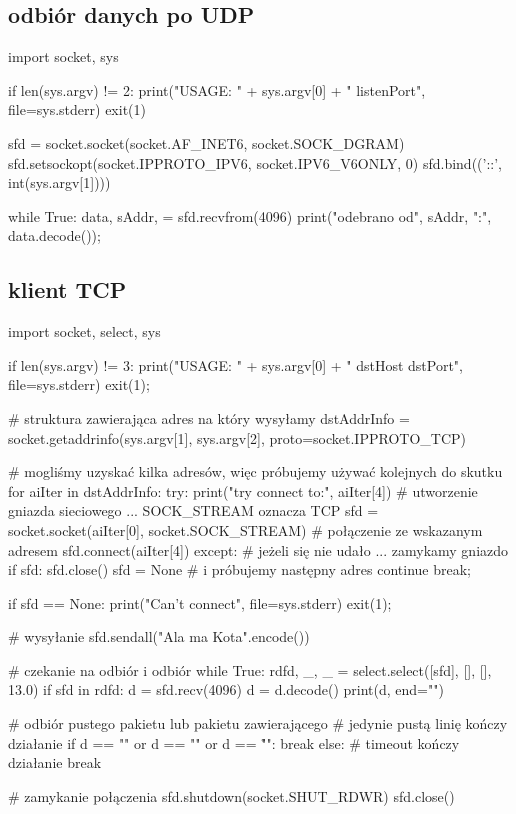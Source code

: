 \subsection{odbiór danych po UDP}
\begin{CodeFrame*}[python]{}
import socket, sys

if len(sys.argv) != 2:
  print("USAGE: " + sys.argv[0] + " listenPort", file=sys.stderr)
  exit(1)

sfd = socket.socket(socket.AF_INET6, socket.SOCK_DGRAM)
sfd.setsockopt(socket.IPPROTO_IPV6, socket.IPV6_V6ONLY, 0)
sfd.bind(('::', int(sys.argv[1])))

while True:
  data, sAddr, = sfd.recvfrom(4096)
  print("odebrano od", sAddr, ":", data.decode());
\end{CodeFrame*}

\subsection{klient TCP}
\begin{CodeFrame*}[python]{}
import socket, select, sys

if len(sys.argv) != 3:
	print("USAGE: " + sys.argv[0] + " dstHost dstPort", file=sys.stderr)
	exit(1);

# struktura zawierająca adres na który wysyłamy
dstAddrInfo = socket.getaddrinfo(sys.argv[1], sys.argv[2], proto=socket.IPPROTO_TCP)

# mogliśmy uzyskać kilka adresów, więc próbujemy używać kolejnych do skutku
for aiIter in dstAddrInfo:
	try:
		print("try connect to:", aiIter[4])
		# utworzenie gniazda sieciowego ... SOCK_STREAM oznacza TCP
		sfd = socket.socket(aiIter[0], socket.SOCK_STREAM)
		# połączenie ze wskazanym adresem
		sfd.connect(aiIter[4])
	except:
		# jeżeli się nie udało ... zamykamy gniazdo
		if sfd:
			sfd.close()
		sfd = None
		# i próbujemy następny adres
		continue
	break;

if sfd == None:
	print("Can't connect", file=sys.stderr)
	exit(1);

# wysyłanie
sfd.sendall("Ala ma Kota\n".encode())

# czekanie na odbiór i odbiór
while True:
	rdfd, _, _ = select.select([sfd], [], [], 13.0)
	if sfd in rdfd:
		d = sfd.recv(4096)
		d = d.decode()
		print(d, end="")
		
		# odbiór pustego pakietu lub pakietu zawierającego
		# jedynie pustą linię kończy działanie
		if d == "" or d == "\n" or d == "\r\n":
			break
	else:
		# timeout kończy działanie
		break

# zamykanie połączenia
sfd.shutdown(socket.SHUT_RDWR)
sfd.close()
\end{CodeFrame*}

